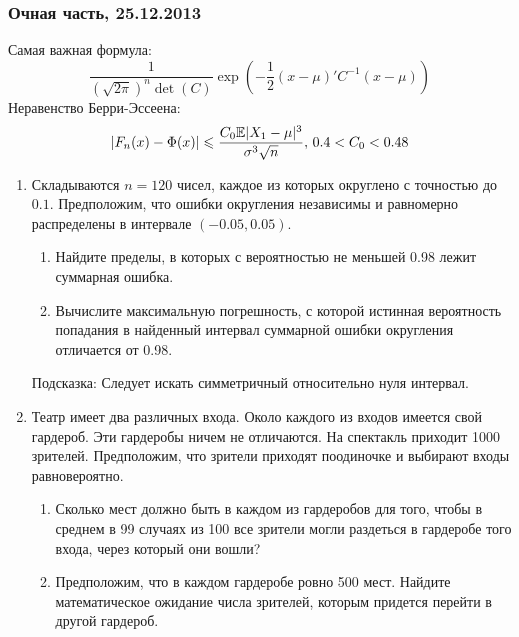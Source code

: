 \documentclass[12pt, a4paper]{article}\usepackage[]{graphicx}\usepackage[]{color}
\begin{document}
				\subsubsection*{Очная часть, 25.12.2013}
				Самая важная формула:
				\[
				\frac{1}{\left(\sqrt{2\pi}\right)^n\det(C)}\exp\left(-\frac{1}{2}(x-\mu)'C^{-1}(x-\mu)\right)
				\]
				Неравенство Берри-Эссеена:
				\[
				|F_n(x)-\Phi(x)| \leqslant \frac{C_0 \mathbb{E}|X_1-\mu|^3}{\sigma^3 \sqrt{n}}, \, 0.4<C_0<0.48
				\]
				\begin{enumerate}


					\item Складываются $n=120$  чисел, каждое из которых округлено с точностью до $0.1$. Предположим, что ошибки округления независимы и равномерно распределены в интервале $(-0.05, 0.05 )$.
					\begin{enumerate}
						\item Найдите  пределы, в которых с вероятностью не меньшей 0.98  лежит суммарная ошибка.
						\item  Вычислите максимальную погрешность, с которой истинная вероятность  попадания в найденный интервал суммарной ошибки округления отличается от 0.98.
					\end{enumerate}
					Подсказка: Следует искать симметричный относительно нуля интервал.

					\item  Театр имеет два различных входа. Около каждого из входов имеется свой гардероб. Эти гардеробы ничем не отличаются. На спектакль приходит 1000 зрителей. Предположим, что зрители приходят поодиночке и выбирают входы равновероятно.
					\begin{enumerate}
						\item Сколько мест должно быть в каждом из гардеробов для того, чтобы в среднем в 99 случаях из 100 все зрители могли раздеться в гардеробе того входа, через который они вошли?
						\item Предположим, что в каждом гардеробе ровно 500 мест. Найдите математическое ожидание числа зрителей, которым придется перейти в другой гардероб.
					\end{enumerate}


\end{enumerate}
\end{document}
